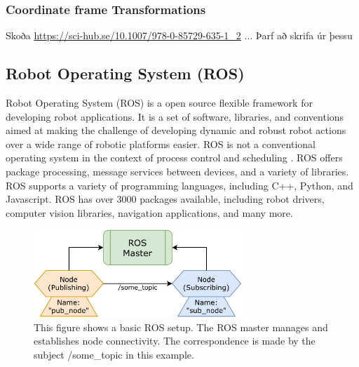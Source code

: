 \subsubsection*{Coordinate frame Transformations}
Skoða %
\url{https://sci-hub.se/10.1007/978-0-85729-635-1_2} ... Þarf að skrifa úr þessu 
\cite{cai_coordinate_2011}

\subsection{Robot Operating System (ROS)}
Robot Operating System (ROS) is a open source flexible framework for developing robot applications. It is a set of software, libraries, and conventions aimed at making the challenge of developing dynamic and robust robot actions over a wide range of robotic platforms easier. ROS is not a conventional operating system in the context of process control and scheduling \cite{quigley_ros_2009}. ROS offers package processing, message services between devices, and a variety of libraries. ROS supports a variety of programming languages, including C++, Python, and Javascript. ROS has over 3000 packages available, including robot drivers, computer vision libraries, navigation applications, and many more.

\begin{figure}[h]%
    \centering
    \includegraphics[width=0.7\textwidth]{graphics/rosmaster.pdf}
    \caption{This figure shows a basic ROS setup. The ROS master manages and establishes node connectivity. The correspondence is made by the subject /some\_topic in this example.}
    \label{fig:rosmaster}
\end{figure}

